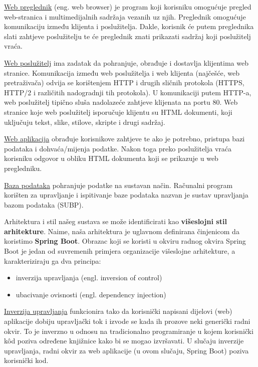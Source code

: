 \underline{Web preglednik} (eng. web browser) je program koji korisniku omogućuje pregled web-stranica i multimedijalnih sadržaja vezanih uz njih. Preglednik omogućuje komunikaciju između klijenta i poslužitelja. Dakle, korisnik će putem preglednika slati zahtjeve poslužitelju te će preglednik znati prikazati sadržaj koji poslužitelj vraća. \par
\vspace{10pt}
\underline{Web poslužitelj}  ima zadatak da pohranjuje, obrađuje i dostavlja klijentima web
stranice. Komunikacija između web poslužitelja i web klijenta (najčešće, web
pretraživača) odvija se korištenjem HTTP i drugih sličnih protokola (HTTPS,
HTTP/2 i različitih nadogradnji tih protokola). U komunikaciji putem HTTP-a, web
poslužitelj tipično sluša nadolazeće zahtjeve klijenata na portu 80. Web stranice koje
web poslužitelj isporučuje klijentu su HTML dokumenti, koji uključuju tekst, slike,
stilove, skripte i drugi sadržaj. \par
\vspace{10pt}
\underline{Web aplikacija} obrađuje korisnikove zahtjeve te ako je potrebno, pristupa bazi podataka i dohvaća/mijenja podatke. Nakon toga preko poslužitelja vraća korisniku odgovor u obliku HTML dokumenta koji se prikazuje u web pregledniku.\par
\vspace{10pt}
\underline{Baza podataka} pohranjuje podatke na sustavan način.  Računalni program korišten za upravljanje i ispitivanje baze podataka nazvan je sustav upravljanja bazom podataka (SUBP).\par

\vspace{15pt}
	
	Arhitektura i stil našeg sustava se može identificirati kao \textbf {višeslojni stil arhitekture}. Naime, naša arhitektura je uglavnom definirana činjenicom da koristimo \textbf{Spring Boot}. Obrazac koji se koristi u okviru radnog okvira Spring Boot je jedan od suvremenih primjera organizacije višeslojne arhitekture, a karakteriziraju ga dva principa:
	\begin{itemize}
		\item inverzija upravljanja (engl. inversion of control)
		\item ubacivanje ovisnosti (engl. dependency injection)
	\end{itemize}

	\underline{Inverzija upravljanja} funkcionira tako da korisnički napisani dijelovi (web) aplikacije
	dobiju upravljački tok i izvode se kada ih prozove neki generički radni okvir.  To je
	inverzno u odnosu na tradicionalno programiranje u kojem korisnički kôd poziva
	određene knjižnice kako bi se mogao izvršavati. U slučaju inverzije upravljanja, radni
	okvir za web aplikacije (u ovom slučaju, Spring Boot) poziva korisnički kod.
	
